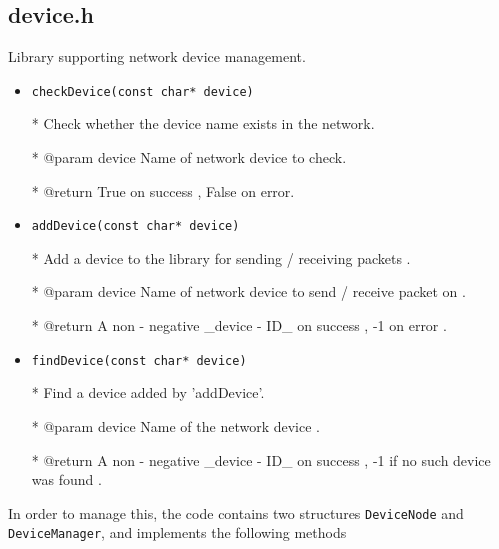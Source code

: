 \documentclass[11pt]{article}
\begin{document}
		
	\subsection*{device.h}
		\par Library supporting network device management.
		\begin{itemize}
			\item \texttt{checkDevice(const char* device)}
			
			* Check whether the device name exists in the network.
			
			* @param device Name of network device to check.
			
			* @return True on success , False on error.
			
			
			\item \texttt{addDevice(const char* device)}
			
			* Add a device to the library for sending / receiving packets .
			
			* @param device Name of network device to send / receive packet on .
			
			* @return A non - negative \_device - ID\_ on success , -1 on error .
			
			\item \texttt{findDevice(const char* device)}
			
			* Find a device added by 'addDevice'.
			
			* @param device Name of the network device .
			
			* @return A non - negative \_device - ID\_ on success , -1 if no such device was found .
		\end{itemize}
		
		In order to manage this, the code contains two structures \texttt{DeviceNode} and \texttt{DeviceManager}, and implements the following methods
		
\end{document}
